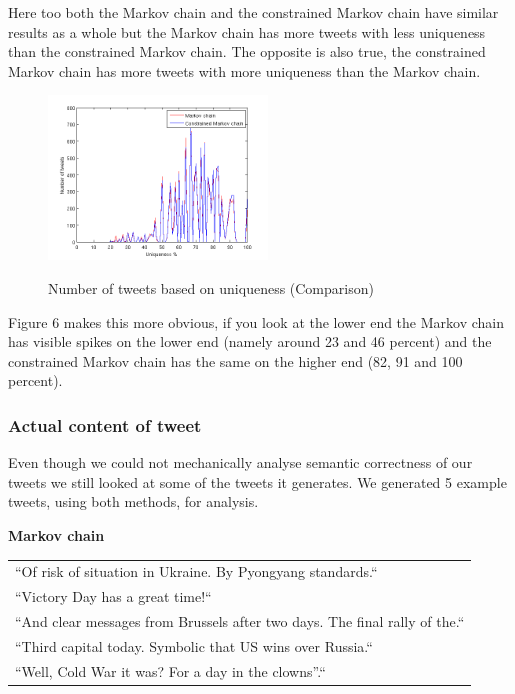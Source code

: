 \documentclass[a4paper,12pt]{article}
\begin{document}
 Here too both the Markov chain and the constrained Markov chain have similar results as a whole but the Markov chain has more tweets with less uniqueness than the constrained Markov chain. The opposite is also true, the constrained Markov chain has more tweets with more uniqueness than the Markov chain.
 
  \begin{figure}[h!]
   \hfill
  {\includegraphics[width=1\linewidth, height = 165]{NumTweetsByUniq2.png}}
  \hfill
  \caption{Number of tweets based on uniqueness (Comparison)}
 \end{figure}

Figure 6 makes this more obvious, if you look at the lower end the Markov chain has visible spikes on the lower end (namely around 23 and 46 percent) and the constrained Markov chain has the same on the higher end (82, 91 and 100 percent).

\subsubsection{Actual content of tweet}
Even though we could not mechanically analyse semantic correctness of our tweets we still looked at some of the tweets it generates. We generated 5 example tweets, using both methods, for analysis.

\textbf{Markov chain}

\begin{tabular}{l}
``Of risk of situation in Ukraine. By Pyongyang standards.``\\
``Victory Day has a great time!\hspace{0 cm}``\\
``And clear messages from Brussels after two days. The final rally of the.``\\
``Third capital today. Symbolic that US wins over Russia.``\\
``Well, Cold War it was? For a day in the clowns''.``
\end{tabular}
\end{document}
